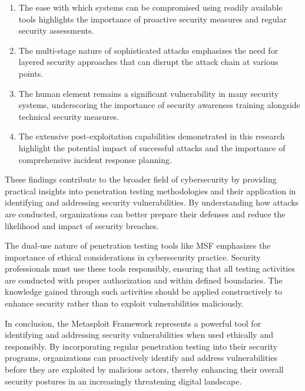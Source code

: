 \documentclass[journal,twoside]{IEEEtran}
\begin{document}
\begin{enumerate}
    \item The ease with which systems can be compromised using readily available tools highlights the importance of proactive security measures and regular security assessments.
    \item The multi-stage nature of sophisticated attacks emphasizes the need for layered security approaches that can disrupt the attack chain at various points.
    \item The human element remains a significant vulnerability in many security systems, underscoring the importance of security awareness training alongside technical security measures.
    \item The extensive post-exploitation capabilities demonstrated in this research highlight the potential impact of successful attacks and the importance of comprehensive incident response planning.
\end{enumerate}

These findings contribute to the broader field of cybersecurity by providing practical insights into penetration testing methodologies and their application in identifying and addressing security vulnerabilities. By understanding how attacks are conducted, organizations can better prepare their defenses and reduce the likelihood and impact of security breaches.

The dual-use nature of penetration testing tools like MSF emphasizes the importance of ethical considerations in cybersecurity practice. Security professionals must use these tools responsibly, ensuring that all testing activities are conducted with proper authorization and within defined boundaries. The knowledge gained through such activities should be applied constructively to enhance security rather than to exploit vulnerabilities maliciously.

In conclusion, the Metasploit Framework represents a powerful tool for identifying and addressing security vulnerabilities when used ethically and responsibly. By incorporating regular penetration testing into their security programs, organizations can proactively identify and address vulnerabilities before they are exploited by malicious actors, thereby enhancing their overall security postures in an increasingly threatening digital landscape.
\end{document}
